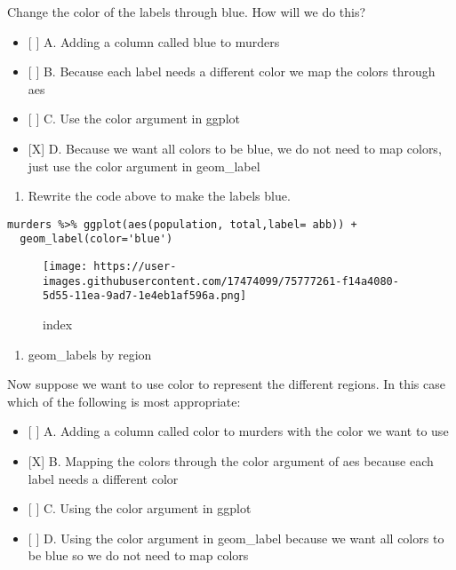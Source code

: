 \documentclass[]{article}
\providecommand{\tightlist}{%
  \setlength{\itemsep}{0pt}\setlength{\parskip}{0pt}}
\begin{document}
Change the color of the labels through blue. How will we do this?

\begin{itemize}
\tightlist
\item
  {[} {]} A. Adding a column called blue to murders
\item
  {[} {]} B. Because each label needs a different color we map the
  colors through aes
\item
  {[} {]} C. Use the color argument in ggplot
\item
  {[}X{]} D. Because we want all colors to be blue, we do not need to
  map colors, just use the color argument in geom\_label
\end{itemize}

\begin{enumerate}
\def\labelenumi{\arabic{enumi}.}
\setcounter{enumi}{9}
\tightlist
\item
  Rewrite the code above to make the labels blue.
\end{enumerate}

\begin{verbatim}
murders %>% ggplot(aes(population, total,label= abb)) +
  geom_label(color='blue')
\end{verbatim}

\begin{figure}
\centering
\texttt{[image: https://user-images.githubusercontent.com/17474099/75777261-f14a4080-5d55-11ea-9ad7-1e4eb1af596a.png]}
\caption{index}
\end{figure}

\begin{enumerate}
\def\labelenumi{\arabic{enumi}.}
\setcounter{enumi}{10}
\tightlist
\item
  geom\_labels by region
\end{enumerate}

Now suppose we want to use color to represent the different regions. In
this case which of the following is most appropriate:

\begin{itemize}
\tightlist
\item
  {[} {]} A. Adding a column called color to murders with the color we
  want to use
\item
  {[}X{]} B. Mapping the colors through the color argument of aes
  because each label needs a different color
\item
  {[} {]} C. Using the color argument in ggplot
\item
  {[} {]} D. Using the color argument in geom\_label because we want all
  colors to be blue so we do not need to map colors
\end{itemize}
\end{document}
